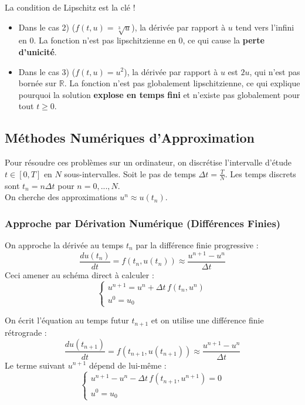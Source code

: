 \begin{explication}
    La condition de Lipschitz est la clé !
    \begin{itemize}
        \item Dans le cas 2) ($f(t,u) = \sqrt[3]{u}$), la dérivée par rapport à $u$ tend vers l'infini en $0$. La fonction n'est pas lipschitzienne en $0$, ce qui cause la \textbf{perte d'unicité}.
        \item Dans le cas 3) ($f(t,u) = u^2$), la dérivée par rapport à $u$ est $2u$, qui n'est pas bornée sur $\mathbb{R}$. La fonction n'est pas globalement lipschitzienne, ce qui explique pourquoi la solution \textbf{explose en temps fini} et n'existe pas globalement pour tout $t \geq 0$.
    \end{itemize}
\end{explication}

\subsection{Méthodes Numériques d'Approximation}

Pour résoudre ces problèmes sur un ordinateur, on discrétise l'intervalle d'étude $t \in [0, T]$ en $N$ sous-intervalles.
Soit le pas de temps $\Delta t = \frac{T}{N}$. Les temps discrets sont $t_n = n \Delta t$ pour $n=0, ..., N$. \\
On cherche des approximations $u^n \approx u(t_n)$.

\subsubsection{Approche par Dérivation Numérique (Différences Finies)}

\begin{algorithme}
    On approche la dérivée au temps $t_n$ par la différence finie progressive :
    \[ \frac{du(t_n)}{dt} = f(t_n, u(t_n)) \approx \frac{u^{n+1} - u^n}{\Delta t} \]
    Ceci amener au schéma direct à calculer :
    \begin{equation*}
        \begin{cases}
            u^{n+1} = u^n + \Delta t \, f(t_n, u^n) \\
            u^0 = u_0
        \end{cases}
    \end{equation*}
\end{algorithme}

\begin{algorithme}
    On écrit l'équation au temps futur $t_{n+1}$ et on utilise une différence finie rétrograde :
    \[ \frac{du(t_{n+1})}{dt} = f(t_{n+1}, u(t_{n+1})) \approx \frac{u^{n+1} - u^n}{\Delta t} \]
    Le terme suivant $u^{n+1}$ dépend de lui-même :
    \begin{equation*}
        \begin{cases}
            u^{n+1} - u^n - \Delta t \, f(t_{n+1}, u^{n+1}) = 0 \\
            u^0 = u_0
        \end{cases}
    \end{equation*}
\end{algorithme}

